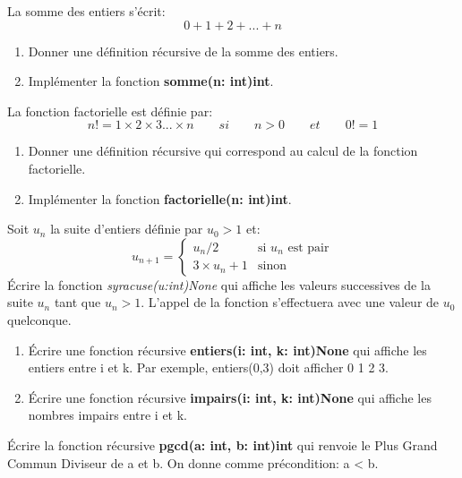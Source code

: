 \documentclass[a4paper,11pt]{article}
\begin{document}
\begin{Form}
\begin{exo}
La somme des entiers s'écrit:
$$0+1+2+...+n$$
\begin{enumerate}
\item Donner une définition récursive de la somme des entiers.
\item Implémenter la fonction \textbf{somme(n: int)\;\rightarrow\;int}.
\end{enumerate}
\end{exo}
\begin{exo}
La fonction factorielle est définie par:
$$n!=1×2×3...×n \qquad si\qquad n>0 \qquad et \qquad 0!=1$$
\begin{enumerate}
\item Donner une définition récursive qui correspond au calcul de la fonction factorielle.
\item Implémenter la fonction \textbf{factorielle(n: int)\;\rightarrow\;int}.
\end{enumerate}
\end{exo}
\begin{exo}
Soit $u_n$ la suite d'entiers définie par $u_0>1$ et:
$$
u_{n+1} = \left\{
    \begin{array}{ll}
        u_n/2 & \mbox{si  }u_n \mbox{ est pair}\\
        3×u_n+1 & \mbox{sinon}\
    \end{array}
\right.
$$
Écrire la fonction \emph{syracuse(u:int)\;\rightarrow\;None} qui affiche les valeurs successives de la suite $u_n$ tant que $u_n>1$. L'appel de la fonction s'effectuera avec une valeur de $u_0$ quelconque.
\end{exo}
\begin{exo}
\begin{enumerate}
\item Écrire une fonction récursive \textbf{entiers(i: int, k: int)\;\rightarrow\;None} qui affiche les entiers entre i et k. Par exemple, entiers(0,3) doit afficher 0 1 2 3.
\item Écrire une fonction récursive \textbf{impairs(i: int, k: int)\;\rightarrow\;None} qui affiche les nombres impairs entre i et k.
\end{enumerate}
\end{exo}
\begin{exo}
Écrire la fonction récursive \textbf{pgcd(a: int, b: int)\;\rightarrow\;int} qui renvoie le Plus Grand Commun Diviseur de a et b. On donne comme précondition: a < b.

\end{exo}
\end{Form}
\end{document}
